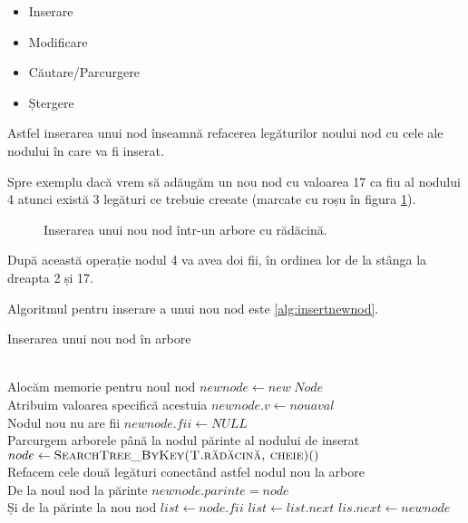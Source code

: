 \begin{itemize}
	\item {Inserare}
	\item {Modificare}
	\item {Căutare/Parcurgere}
	\item {Ștergere}
\end{itemize}

Astfel inserarea unui nod înseamnă refacerea legăturilor noului nod cu cele ale nodului în care va fi inserat. 

Spre exemplu dacă vrem să adăugăm un nou nod cu valoarea 17 ca fiu al nodului 4 atunci există 3 legături ce trebuie creeate (marcate cu roșu în figura \ref{fig:inseraremultiplu}).

\begin{figure}[H] 
	\centering	
	{
	}
	\caption{Inserarea unui nou nod într-un arbore cu rădăcină.} 
	\label{fig:inseraremultiplu}
\end{figure}

După această operație nodul 4 va avea doi fii, în ordinea lor de la stânga la dreapta 2 și 17.

Algoritmul pentru inserare a unui nou nod este \ref{alg:insertnewnod}.

\begin{algorithm}[H]
	\caption{Inserarea unui nou nod în arbore}\label{alg:insertnewnod}
	\begin{algorithmic}[1]
		 \\		
		\Comment Alocăm memorie pentru noul nod \hfill \tab{}\tab{}\tab{}\tab{}
		\State $newnode \gets new \hspace{3pt} Node$\\
		\Comment Atribuim valoarea specifică acestuia \hfill \tab{}\tab{}\tab{}
		\State $newnode.v \gets nouaval$\\
		\Comment Nodul nou nu are fii  \hfill \tab{}\tab{}\tab{}\tab{}\tab{}
		\State $newnode.fii \gets NULL$\\
		\Comment Parcurgem arborele până la nodul părinte al nodului de inserat
		\State $node \gets \Call{SearchTree\_ByKey(T.rădăcină, cheie)}$	\\			
		\Comment Refacem cele două legături conectând astfel nodul nou la arbore\\
		\Comment De la noul nod la părinte  \hfill \tab{}\tab{}\tab{}\tab{}
		\State $newnode.parinte=node$\\
		\Comment Și de la părinte la nou nod  \hfill \tab{}\tab{}\tab{} \tab{} 
		\State $list \gets node.fii$
		\State $list \gets list.next$
		\EndWhile 			
		\State $lis.next \gets newnode$
		\EndProcedure
		\end{algorithmic}
	\end{algorithm}

